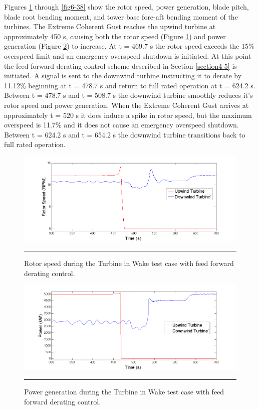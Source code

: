 Figures \ref{fig6-34} through \ref{fig6-38} show the rotor speed, power generation, blade pitch, blade root bending moment, and tower base fore-aft bending moment of the turbines.  The Extreme Coherent Gust reaches the upwind turbine at approximately 450 s, causing both the rotor speed (Figure \ref{fig6-34}) and power generation (Figure \ref{fig6-35}) to increase. At t = 469.7 s the rotor speed exceeds the 15\% overspeed limit and an emergency overspeed shutdown is initiated. At this point the feed forward derating control scheme described in Section \ref{section4-5} is initiated. A signal is sent to the downwind turbine instructing it to derate by 11.12\% beginning at t = 478.7 s and return to full rated operation at t = 624.2 s. Between t = 478.7 s and t = 508.7 s the downwind turbine smoothly reduces it's rotor speed and power generation. When the Extreme Coherent Gust arrives at approximately t = 520 s it does induce a spike in rotor speed, but the maximum overspeed is 11.7\% and it does not cause an emergency overspeed shutdown. Between t = 624.2 s and t = 654.2 s the downwind turbine transitions back to full rated operation.


\begin{figure}[htbp] \label{fig6-34}
	\centering
		\includegraphics[trim = {1cm 0 2cm 0}, clip, width = \linewidth]{Figures/ch6Figures/fig6-34.png}
		\rule{35em}{0.5pt}
	\caption{Rotor speed during the Turbine in Wake test case with feed forward derating control.}
\end{figure}

\begin{figure}[htbp] \label{fig6-35}
	\centering
		\includegraphics[trim = {1cm 0 2cm 0}, clip, width = \linewidth]{Figures/ch6Figures/fig6-35.png}
		\rule{35em}{0.5pt}
	\caption{Power generation during the Turbine in Wake test case with feed forward derating control.}
\end{figure}

